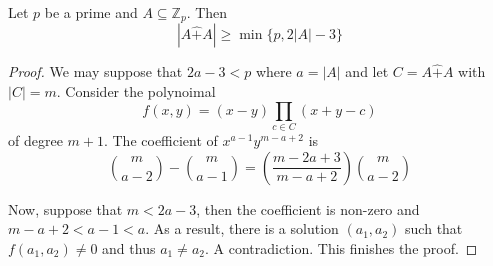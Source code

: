 \begin{theorem}
    Let $p$ be a prime and $A\subseteq\mathbb{Z}_p$. Then 
    \begin{equation*}
        |A \widehat{+} A|\ge\min\{p, 2|A| - 3\}
    \end{equation*}
\end{theorem}
\begin{proof}
    We may suppose that $2a - 3 < p$ where $a = |A|$ and let $C = A \widehat{+} A$ with $|C| = m$. Consider the polynoimal 
    \begin{equation*}
        f(x,y) = (x - y)\prod_{c\in C}(x + y - c)
    \end{equation*}
    of degree $m + 1$. The coefficient of $x^{a - 1}y^{m - a + 2}$ is 
    \begin{equation*}
        \binom{m}{a - 2} - \binom{m}{a - 1} = \left(\frac{m - 2a + 3}{m - a + 2}\right)\binom{m}{a - 2}
    \end{equation*}

    Now, suppose that $m < 2a - 3$, then the coefficient is non-zero and $m - a + 2 < a - 1 < a$. As a result, there is a solution $(a_1, a_2)$ such that $f(a_1, a_2)\ne0$ and thus $a_1\ne a_2$. A contradiction. This finishes the proof.
\end{proof}